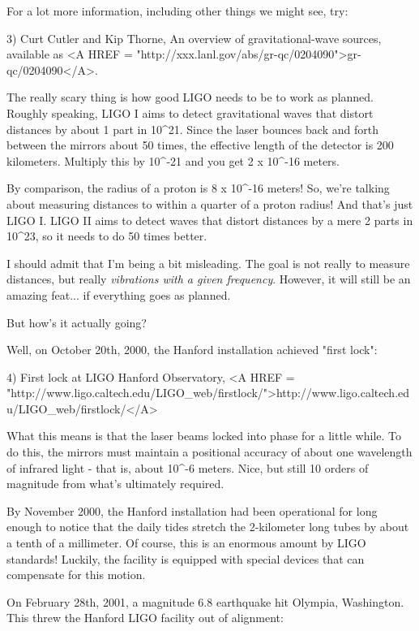 For a lot more information, including other things we might see, try:
 
3) Curt Cutler and Kip Thorne, An overview of gravitational-wave
sources, available as <A HREF = "http://xxx.lanl.gov/abs/gr-qc/0204090">gr-qc/0204090</A>.

The really scary thing is how good LIGO needs to be to work as
planned.  Roughly speaking, LIGO I aims to detect gravitational 
waves that distort distances by about 1 part in 10^{21}.  Since 
the laser bounces back and forth between the mirrors about 50
times, the effective length of the detector is 200 kilometers.  
Multiply this by 10^{-21} and you get 2 x 10^{-16} meters.  

By comparison, the radius of a proton is 8 x 10^{-16} meters!  So, 
we're talking about measuring distances to within a quarter of a 
proton radius!  And that's just LIGO I.  LIGO II aims to detect 
waves that distort distances by a mere 2 parts in 10^{23}, so 
it needs to do 50 times better.

I should admit that I'm being a bit misleading.  The goal is not really
to measure distances, but really \emph{vibrations with a given frequency}.  
However, it will still be an amazing feat... if everything goes as planned.

But how's it actually going?  

Well, on October 20th, 2000, the Hanford installation achieved 
"first lock":

4) First lock at LIGO Hanford Observatory,
<A HREF = "http://www.ligo.caltech.edu/LIGO_web/firstlock/">http://www.ligo.caltech.edu/LIGO_web/firstlock/</A>

What this means is that the laser beams locked into phase for a little 
while.  To do this, the mirrors must maintain a positional accuracy of 
about one wavelength of infrared light - that is, about 10^{-6} meters.
Nice, but still 10 orders of magnitude from what's ultimately required.  

By November 2000, the Hanford installation had been operational for
long enough to notice that the daily tides stretch the 2-kilometer 
long tubes by about a tenth of a millimeter.  Of course, this is an 
enormous amount by LIGO standards!  Luckily, the facility is equipped 
with special devices that can compensate for this motion.  

On February 28th, 2001, a magnitude 6.8 earthquake hit Olympia,
Washington.  This threw the Hanford LIGO facility out of alignment:

